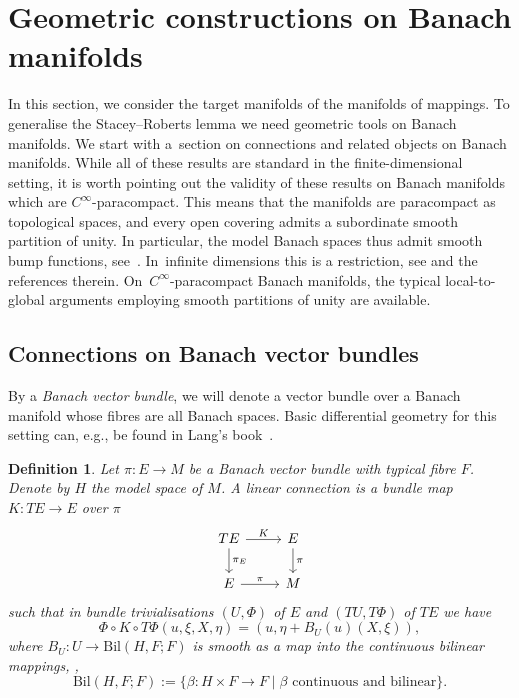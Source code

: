 \documentclass[11pt]{article}
\numberwithin{equation}{section}
\numberwithin{equation}{section}
\newtheorem{Definition}[Theorem]{Definition}
\begin{document}
\section{Geometric constructions on Banach manifolds}

In this section, we consider the target manifolds of the manifolds of mappings. To generalise the Stacey--Roberts lemma we need geometric tools on Banach manifolds.
We start with a~section on connections and related objects on Banach manifolds.
While all of these results are standard in the finite-dimensional setting, it is worth pointing out the validity of these results on Banach manifolds which are $C^\infty$-paracompact.
This means that the manifolds are paracompact as topological spaces, and every open covering admits a subordinate smooth partition of unity. In particular, the model Banach spaces thus admit smooth bump functions, see~\cite{BaF66}.
In~infinite dimensions this is a restriction, see \cite[Appendix~A.4]{Sch23} and the references therein. On~$C^\infty$-paracompact Banach manifolds, the typical local-to-global arguments employing smooth partitions of unity are available.

\subsection{Connections on Banach vector bundles}

By a \emph{Banach vector bundle}, we will denote a vector bundle over a Banach manifold whose fibres are all Banach spaces. Basic differential geometry for this setting can, e.g., be found in Lang's book~\cite{La01}.


\begin{Definition}\label{defn:connect_lin}
Let $\pi \colon E \rightarrow M$ be a Banach vector bundle with typical fibre $F$. Denote by $H$ the model space of $M$. A \emph{linear connection} is a bundle map $K \colon TE \rightarrow E$ over $\pi$
\begin{displaymath}\begin{tikzcd}
TE \arrow[r,"K"]\arrow[d,"\pi_E"] & E \arrow[d,"\pi"]\\
E \arrow[r,"\pi"] & M
\end{tikzcd}\end{displaymath}
such that in bundle trivialisations $(U,\Phi)$ of $E$ and $(TU,T\Phi)$ of $TE$ we have \begin{displaymath}\Phi \circ K\circ T\Phi(u,\xi, X, \eta) = (u,\eta + B_U (u)(X,\xi)),\end{displaymath} where $B_U \colon U \rightarrow \mathrm{Bil} (H,F;F)$ is smooth as a map into the continuous bilinear mappings, \mbox{\cite[Definition 1.5.9]{Kli95}}, \begin{displaymath}
 \mathrm{Bil}(H,F;F) := \{\beta \colon H \times F \rightarrow F \mid \beta \text{ continuous and bilinear}\}.
\end{displaymath}
\end{Definition}
\end{document}
